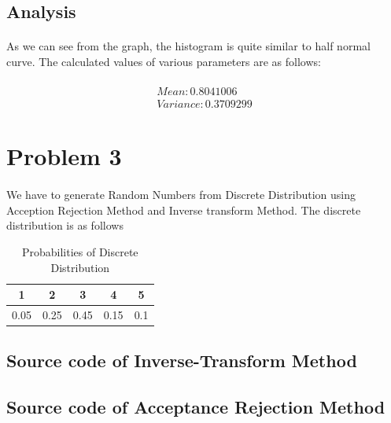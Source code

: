 \documentclass{article}
\begin{document}
		\subsection{Analysis}
		\paragraph{}
			As we can see from the graph, the histogram is quite similar to half normal curve. The calculated values of various parameters are as follows:
			
	
	    \paragraph{}
		\begin{gather}	    
	    Mean:  0.8041006 \\
Variance:  0.3709299
	    \end{gather}
		
		\pagebreak
		
		
	    \section{Problem 3}
	    \paragraph{}
		We have to generate Random Numbers from Discrete Distribution using Acception Rejection Method and Inverse transform Method. The discrete distribution is as follows
		
		\begin{table}[h!]
      \centering
      \caption{Probabilities of Discrete Distribution}
      \label{tab:table1}
      \begin{tabular}{c c c c c}
        \toprule
        1 &2 &3 &4&5 \\
        \midrule
        0.05& 0.25& 0.45& 0.15& 0.1 \\
        \bottomrule
      \end{tabular}
    \end{table}
		
		
	\subsection{Source code of Inverse-Transform Method}			                       
		
	\subsection{Source code of Acceptance Rejection Method}			                       	
		
\end{document}

